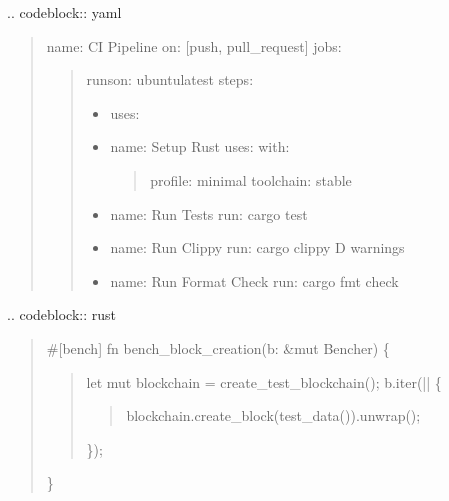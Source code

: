 \documentclass[letterpaper,10pt,english]{sphinxmanual}
\begin{document}
\sphinxAtStartPar
{}
.. code\sphinxhyphen{}block:: yaml
\begin{quote}

\sphinxAtStartPar
name: CI Pipeline
on: {[}push, pull\_request{]}
jobs:
\begin{quote}
\begin{description}
\sphinxAtStartPar
runs\sphinxhyphen{}on: ubuntu\sphinxhyphen{}latest
steps:
\begin{itemize}
\item {} 
\sphinxAtStartPar
uses: 

\item {} 
\sphinxAtStartPar
name: Setup Rust
uses: 
with:
\begin{quote}

\sphinxAtStartPar
profile: minimal
toolchain: stable
\end{quote}

\item {} 
\sphinxAtStartPar
name: Run Tests
run: cargo test

\item {} 
\sphinxAtStartPar
name: Run Clippy
run: cargo clippy \textendash{} \sphinxhyphen{}D warnings

\item {} 
\sphinxAtStartPar
name: Run Format Check
run: cargo fmt \textendash{} \textendash{}check

\end{itemize}

\end{description}
\end{quote}
\end{quote}

\sphinxAtStartPar
{}
.. code\sphinxhyphen{}block:: rust
\begin{quote}

\sphinxAtStartPar
\#{[}bench{]}
fn bench\_block\_creation(b: \&mut Bencher) \{
\begin{quote}

\sphinxAtStartPar
let mut blockchain = create\_test\_blockchain();
b.iter(|| \{
\begin{quote}

\sphinxAtStartPar
blockchain.create\_block(test\_data()).unwrap();
\end{quote}

\sphinxAtStartPar
\});
\end{quote}

\sphinxAtStartPar
\}
\end{quote}
\end{document}
